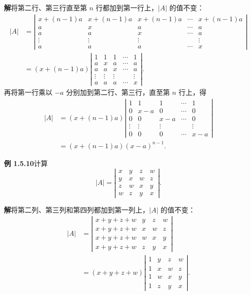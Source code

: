 \documentclass[UTF8, 12pt, fontset=fandol, oneside]{ctexart}
\begin{document}
\noindent\textbf{解}\quad 将第二行、第三行直至第 $n$ 行都加到第一行上，$|A|$ 的值不变：
\[
\begin{aligned}
|A|
&=
\left|\begin{array}{ccccc}
x+(n-1)a & x+(n-1)a & x+(n-1)a & \cdots & x+(n-1)a\\
a & x & a & \cdots & a\\
a & a & x & \cdots & a\\
\vdots & \vdots & \vdots & & \vdots\\
a & a & a & \cdots & x
\end{array}\right|\\
&=(x+(n-1)a)
\left|\begin{array}{ccccc}
1 & 1 & 1 & \cdots & 1\\
a & x & a & \cdots & a\\
a & a & x & \cdots & a\\
\vdots & \vdots & \vdots & & \vdots\\
a & a & a & \cdots & x
\end{array}\right|.
\end{aligned}
\]
再将第一行乘以 $-a$ 分别加到第二行、第三行，直至第 $n$ 行上，得
\[
\begin{aligned}
|A|
&=(x+(n-1)a)
\left|\begin{array}{ccccc}
1 & 1 & 1 & \cdots & 1\\
0 & x-a & 0 & \cdots & 0\\
0 & 0 & x-a & \cdots & 0\\
\vdots & \vdots & \vdots & & \vdots\\
0 & 0 & 0 & \cdots & x-a
\end{array}\right|\\
&=(x+(n-1)a)(x-a)^{n-1}.
\end{aligned}
\]

\noindent\textbf{例 1.5.10}\quad 计算
\[
|A|=
\left|\begin{array}{rrrr}
x & y & z & w\\
y & x & w & z\\
z & w & x & y\\
w & z & y & x
\end{array}\right|.
\]

\noindent\textbf{解}\quad 将第二列、第三列和第四列都加到第一列上，$|A|$ 的值不变：
\[
\begin{aligned}
|A|
&=
\left|\begin{array}{rrrr}
x+y+z+w & y & z & w\\
x+y+z+w & x & w & z\\
x+y+z+w & w & x & y\\
x+y+z+w & z & y & x
\end{array}\right|\\
&=(x+y+z+w)
\left|\begin{array}{rrrr}
1 & y & z & w\\
1 & x & w & z\\
1 & w & x & y\\
1 & z & y & x
\end{array}\right|.
\end{aligned}
\]
\end{document}
